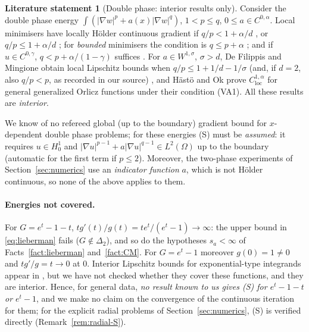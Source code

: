 \documentclass[11pt]{amsart}
\theoremstyle{definition}
\newtheorem{fact}[theorem]{Literature statement}
\theoremstyle{remark}
\numberwithin{equation}{section}
\newcommand{\abs}[1]{\lvert #1\rvert}
\begin{document}
\begin{fact}[Double phase: interior results only]\label{fact:dp}
Consider the double phase energy $\int(\abs{\nabla w}^p+a(x)\abs{\nabla w}^q)$, $1<p\le q$, $0\le a\in C^{0,\alpha}$. Local minimisers have locally H\"older continuous gradient if $q/p<1+\alpha/d$ \cite[Thm.~1.2]{ColomboMingione2015a}, or $q/p\le1+\alpha/d$ \cite[Thm.~1.1]{BaroniColomboMingione2018}; for \emph{bounded} minimisers the condition is $q\le p+\alpha$ \cite{ColomboMingione2015b,BaroniColomboMingione2018}; and if $u\in C^{0,\gamma}$, $q<p+\alpha/(1-\gamma)$ suffices \cite[Thm.~1.3]{BaroniColomboMingione2018}. For $a\in W^{1,\sigma}$, $\sigma>d$, De Filippis and Mingione obtain local Lipschitz bounds when $q/p\le1+1/d-1/\sigma$ (and, if $d=2$, also $q/p<p$, as recorded in our source) \cite[Thm.~1.3]{DeFilippisMingione2021}, and H\"ast\"o and Ok \cite{HastoOk2022} prove $C^{1,\alpha}_{\mathrm{loc}}$ for general generalized Orlicz functions under their condition (VA1). All these results are \emph{interior}.
\end{fact}
We know of no refereed global (up to the boundary) gradient bound for $x$-dependent double phase problems; for these energies (S) must be \emph{assumed}: it requires $u\in H^1_0$ and $\abs{\nabla u}^{p-1}+a\abs{\nabla u}^{q-1}\in L^2(\Omega)$ up to the boundary (automatic for the first term if $p\le2$). Moreover, the two-phase experiments of Section~\ref{sec:numerics} use an \emph{indicator function} $a$, which is not H\"older continuous, so none of the above applies to them.

\paragraph{Energies not covered.} For $G=e^t-1-t$, $tg'(t)/g(t)=te^t/(e^t-1)\to\infty$: the upper bound in \eqref{eq:lieberman} fails ($G\notin\Delta_2$), and so do the hypotheses $s_a<\infty$ of Facts~\ref{fact:lieberman} and~\ref{fact:CM}. For $G=e^t-1$ moreover $g(0)=1\ne0$ and $tg'/g=t\to0$ at $0$. Interior Lipschitz bounds for exponential-type integrands appear in \cite[Thms.~1.4--1.5]{DeFilippisMingione2021}, but we have not checked whether they cover these functions, and they are interior. Hence, for general data, \emph{no result known to us gives (S) for $e^t-1-t$ or $e^t-1$}, and we make no claim on the convergence of the continuous iteration for them; for the explicit radial problems of Section~\ref{sec:numerics}, (S) is verified directly (Remark~\ref{rem:radial-S}).
\end{document}
